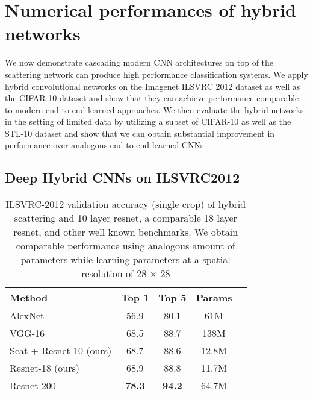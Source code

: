 \documentclass[10pt,twocolumn,letterpaper]{article}
\begin{document}
 
\section{Numerical performances of hybrid networks}
\label{small2}
We now demonstrate cascading modern CNN architectures on top of the scattering network can produce high performance classification systems. We apply hybrid convolutional networks on the Imagenet ILSVRC 2012 dataset as well as the CIFAR-10 dataset and show that they can achieve performance comparable to modern end-to-end learned approaches. We then evaluate the hybrid networks in the setting of limited data by utilizing a subset of CIFAR-10 as well as the STL-10 dataset and show that we can obtain substantial improvement in performance over analogous end-to-end learned CNNs. 

\subsection{Deep Hybrid CNNs on ILSVRC2012}
\label{hybimnet}
\begin{table}
\begin{center}
\begin{tabular}{|l|c|c|c|c|}
\hline
\bf Method  &\bf Top 1 &\bf Top 5 &\bf Params \\
\hline
AlexNet & 56.9&80.1&61M\\VGG-16 \cite{han2015learning}&68.5&88.7&138M\\Scat + Resnet-10 (ours)&68.7&88.6&12.8M\\Resnet-18 (ours) & 68.9&88.8&11.7M\\Resnet-200 \cite{zagoruyko2016wide} & \textbf{78.3} & \textbf{94.2} & 64.7M  \\\hline
\end{tabular}
\end{center}
\caption{ILSVRC-2012 validation accuracy (single crop) of hybrid scattering and 10 layer resnet, a comparable 18 layer resnet, and other well known benchmarks. We obtain comparable performance using analogous amount of parameters while learning parameters at a spatial resolution of 28 $\times$ 28}
\label{tab:imagenet_full}
\end{table}
\end{document}
